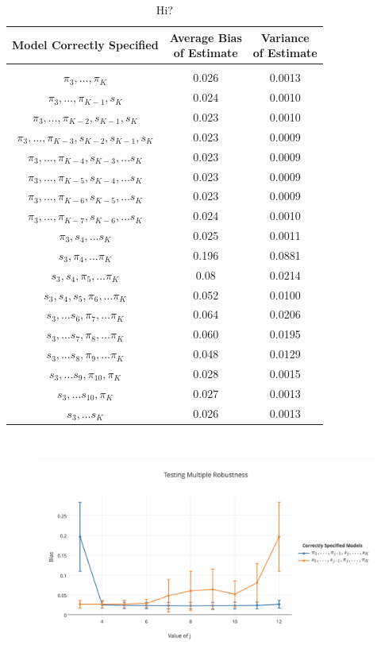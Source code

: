 \begin{table}[h!]
\centering
\begin{tabular} {c | c  c}
Model Correctly Specified & \shortstack{Average Bias \\ of Estimate}  & \shortstack{Variance \\of Estimate} \\ 
\hline  \\
$\pi_3, \dots, \pi_K$ & 0.026 & 0.0013   \\ 
$\pi_3, \dots, \pi_{K-1}, s_K$ & 0.024 & 0.0010\\ 
$\pi_3, \dots, \pi_{K-2}, s_{K-1}, s_K$ & 0.023 & 0.0010\\ 
$\pi_3, \dots, \pi_{K-3}, s_{K-2} , s_{K-1}, s_K$ & 0.023  &0.0009 \\ 
$\pi_3, \dots, \pi_{K-4}, s_{K-3}, \dots s_K $ & 0.023&0.0009 \\ 
$\pi_3, \dots, \pi_{K-5}, s_{K-4}, \dots s_K $ &  0.023 &0.0009\\ 
$\pi_3, \dots, \pi_{K-6}, s_{K-5}, \dots s_K $ &  0.023 & 0.0009 \\ 
$\pi_3, \dots, \pi_{K-7}, s_{K-6}, \dots s_K $ &  0.024 & 0.0010\\ 
$\pi_3, s_{4}, \dots s_K $ &  0.025& 0.0011  \\ 
$s_3, \pi_4, \dots \pi_K$ &  0.196 & 0.0881 \\ 
$s_3, s_4, \pi_5, \dots \pi_K$ & 0.08 & 0.0214  \\ 
$s_3, s_4, s_5, \pi_6, \dots \pi_K$ & 0.052 & 0.0100  \\ 
$s_3, \dots s_6, \pi_7, \dots \pi_K$ & 0.064 &0.0206 \\ 
$s_3, \dots s_7, \pi_8, \dots \pi_K$ &  0.060 &  0.0195   \\ 
$s_3, \dots s_8, \pi_9, \dots \pi_K$ & 0.048 &0.0129   \\ 
$s_3, \dots s_9, \pi_{10}, \pi_K$ &  0.028 & 0.0015 \\ 
$s_3, \dots s_{10}, \pi_K$ & 0.027 & 0.0013 \\
$s_3, \dots s_K$ & 0.026 & 0.0013\\ 
\end{tabular} \\
\centering
\caption{Hi?}
\end{table}

\begin{figure}
\includegraphics[width = 1.1\linewidth]{figures/multiplerobust.png}
\caption{}
\label{multirobust}
\end{figure} 

